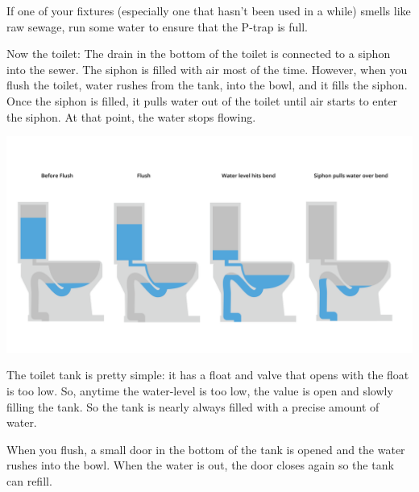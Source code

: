 If one of your fixtures (especially one that hasn't been used in a while) smells like raw sewage,  run
some water to ensure that the P-trap is full.

Now the toilet:  The drain in the bottom of the toilet is connected to a siphon into the sewer.   The siphon is filled with air most of the time.  However, when you flush the toilet,  water rushes from the tank, into the bowl,  and it fills the siphon.  Once the siphon is filled,  it pulls water out of the toilet until air starts to enter the siphon.  At that point,  the water stops flowing.

\includegraphics[width=\textwidth]{toilet.png}


The toilet tank is pretty simple: it has a float and valve that opens with the float is too low.   So, anytime the water-level is too low,  the value is open and slowly filling the tank.   So the tank is nearly always filled with a precise amount of water.

When you flush,  a small door in the bottom of the tank is opened and the water rushes into the bowl.  When the water is out,  the door closes again so the tank can refill.
